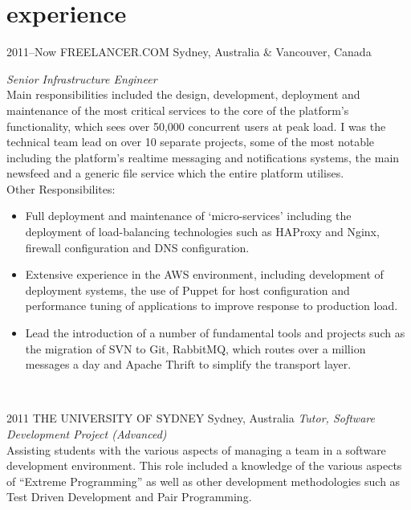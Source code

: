 \documentclass[]{friggeri-cv} %
\begin{document}

\section{experience}

\begin{entrylist}
\entry
{2011--Now}
{FREELANCER.COM}
{Sydney, Australia \& Vancouver, Canada}
{\emph{Senior Infrastructure Engineer} \\

Main responsibilities included the design, development, deployment and maintenance of the most critical services to the core of the platform’s functionality, which sees over 50,000 concurrent users 
at peak load. I was the technical team lead on over 10 separate projects, some of the most notable including the platform’s realtime messaging and notifications systems, the main newsfeed and a generic file service which the entire platform utilises. \\

Other Responsibilites:\\

\begin{itemize}
    \item Full deployment and maintenance of ‘micro-services’ including the deployment of load-balancing technologies such as HAProxy and Nginx, firewall configuration and DNS configuration.
    \item Extensive experience in the AWS environment, including development of deployment systems, the use of Puppet for host configuration and performance tuning of applications to improve response to production load.
    \item Lead the introduction of a number of fundamental tools and projects such as the migration of SVN to Git, RabbitMQ, which routes over a million messages a day and Apache Thrift to simplify the transport layer.
\end{itemize}
~
}
\entry
{2011}
{THE UNIVERSITY OF SYDNEY}
{Sydney, Australia}
{\emph{Tutor, Software Development Project (Advanced)} \\

Assisting students with the various aspects of managing a team in a software development environment.
This role included a knowledge of the various aspects of “Extreme Programming” as well as other development methodologies such as Test Driven Development and Pair Programming. \\
}
\end{entrylist}
\end{document}
